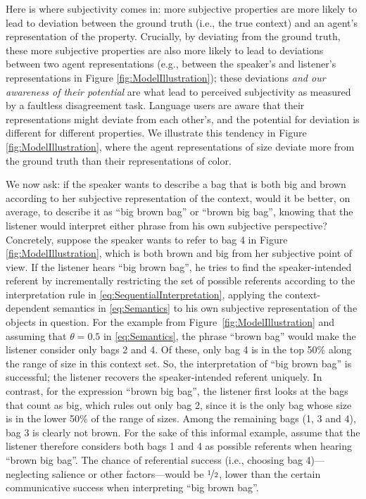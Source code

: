 \documentclass[10pt,a4paper]{article}
\begin{document}
Here is where subjectivity comes in: more subjective properties are more likely to lead to deviation between the ground truth (i.e., the true context) and an agent's representation of the property. Crucially, by deviating from the ground truth, these more subjective properties are also more likely to lead to deviations between two agent representations (e.g., between the speaker's and listener's representations in Figure \ref{fig:ModelIllustration}); these deviations \emph{and our awareness of their potential} are what lead to perceived subjectivity as measured by a faultless disagreement task. Language users are aware that their representations might deviate from each other's, and the potential for deviation is different for different properties. We illustrate this tendency in Figure \ref{fig:ModelIllustration}, where the agent representations of size deviate more from the ground truth than their representations of color.

We now ask: if the speaker wants to describe a bag that is both big and brown according to her subjective representation of the context, would it be better, on average, to describe it as ``big brown bag'' or ``brown big bag'', knowing that the listener would interpret either phrase from his own subjective perspective? Concretely, suppose the speaker wants to refer to bag 4 in Figure \ref{fig:ModelIllustration}, which is both brown and big from her subjective point of view. If the listener hears ``big brown bag'', he tries to find the speaker-intended referent by incrementally restricting the set of possible referents according to the interpretation rule in \eqref{eq:SequentialInterpretation}, applying the context-dependent semantics in \eqref{eq:Semantics} to his own subjective representation of the objects in question. For the example from Figure~\ref{fig:ModelIllustration} and assuming that $\theta = 0.5$ in \eqref{eq:Semantics}, the phrase ``brown bag'' would make the listener consider only bags 2 and 4. Of these, only bag 4 is in the top 50\% along the range of size in this context set. So, the interpretation of ``big brown bag'' is successful; the listener recovers the speaker-intended referent uniquely. In contrast, for the expression ``brown big bag'', the listener first looks at the bags that count as big, which rules out only bag 2, since it is the only bag whose size is in the lower 50\% of the range of sizes. Among the remaining bags (1, 3 and 4), bag 3 is clearly not brown. For the sake of this informal example, assume that the listener therefore considers both bags 1 and 4 as possible referents when hearing ``brown big bag''. The chance of referential success (i.e., choosing bag 4)---neglecting salience or other factors---would be $\nicefrac{1}{2}$, lower than the certain communicative success when interpreting ``big brown bag''.
\end{document}
